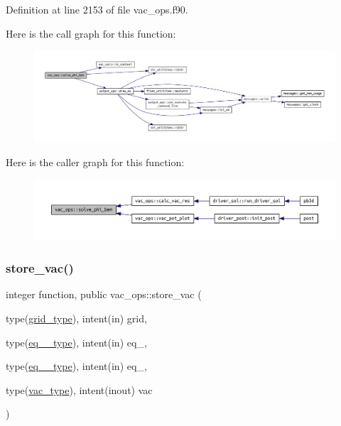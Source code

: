 Definition at line 2153 of file vac\+\_\+ops.\+f90.

Here is the call graph for this function\+:\nopagebreak
\begin{figure}[H]
\begin{center}
\leavevmode
\includegraphics[width=350pt]{namespacevac__ops_ace79efa50ae5a120e515164c99ce9582_cgraph}
\end{center}
\end{figure}
Here is the caller graph for this function\+:\nopagebreak
\begin{figure}[H]
\begin{center}
\leavevmode
\includegraphics[width=350pt]{namespacevac__ops_ace79efa50ae5a120e515164c99ce9582_icgraph}
\end{center}
\end{figure}
\mbox{\label{namespacevac__ops_a37220702fbf378626a0f2c12f446e0aa}} 
\subsubsection{\texorpdfstring{store\+\_\+vac()}{store\_vac()}}
{\footnotesize\ttfamily integer function, public vac\+\_\+ops\+::store\+\_\+vac (\begin{DoxyParamCaption}\item[{type(\hyperlink{structgrid__vars_1_1grid__type}{grid\+\_\+type}), intent(in)}]{grid,  }\item[{type(\hyperlink{structeq__vars_1_1eq__1__type}{eq\+\_\+1\+\_\+type}), intent(in)}]{eq\+\_,  }\item[{type(\hyperlink{structeq__vars_1_1eq__2__type}{eq\+\_\+2\+\_\+type}), intent(in)}]{eq\+\_,  }\item[{type(\hyperlink{structvac__vars_1_1vac__type}{vac\+\_\+type}), intent(inout)}]{vac }\end{DoxyParamCaption})}



